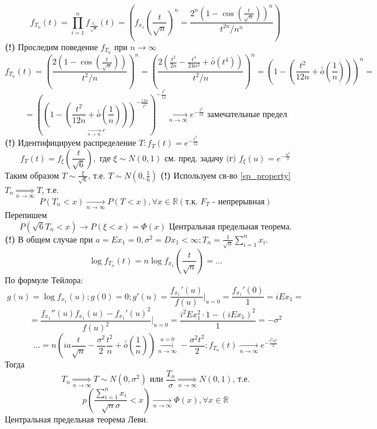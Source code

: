 \begin{exmp}
\begin{enumerate}
		\[ f_{T_n} (t) = \prod_{i=1}^{n} f_{\frac{x_i}{\sqrt{n}}} (t) = \left( f_{x_1} \left(\frac{t}{\sqrt{n}}\right)^n = \frac{2^n (1 - \cos \left( \frac{t}{\sqrt{n}} \right))^n}{t^{2n}/n^n} \right) \]
		\textbf{(!)} Проследим поведение $f_{T_n}$ при $n \to \infty$
		\[ f_{T_n} (t) = \left( \frac{2 (1 - \cos \left( \frac{t}{\sqrt{n}} \right))}{t^2 / n} \right)^n = \left( \frac{2 \left( \frac{t^2}{2n} - \frac{t^4}{24n^2} + \bar{\bar o} (t^4) \right)}{t^2 / n} \right)^n = \left( 1 - \left( \frac{t^2}{12n} + \bar{\bar o} \left( \frac{1}{n} \right) \right) \right)^n = \]
		\[ = \left( \underset{\underset{n \to \infty}{\to} e}{\left( 1 - \left( \frac{t^2}{12n} + \bar{\bar o} \left(\frac{1}{n}\right) \right) \right)^{-\frac{12n}{t^2}}} \right)^{- \frac{t^2}{12}} \underset{n \to \infty}{\to} e^{- \frac{t^2}{12}} \text{ замечательные предел} \]
		\textbf{(!)} Идентифицируем распределение $T: f_{T} (t) = e^{-\frac{t^2}{12}}$
		\[ f_{T} (t) = f_{\xi} \left( \frac{t}{\sqrt{6}} \right), \text{ где } \xi \sim N(0, 1) \text{ см. пред. задачу (г) } f_{\xi} (u) = e^{- \frac{u^2}{2}} \]
		Таким образом $T \sim \frac{\xi}{\sqrt{6}}$, т.е. $T \sim N \left( 0, \frac{1}{6} \right)$
		\textbf{(!)} Используем св-во \ref{sp_property} $T_n \underset{n \to \infty}{\Rightarrow} T$, т.е.
		\[ P(T_n < x) \underset{n \to \infty}{\to} P(T < x), \forall x \in \mathbb{R} (\text{т.к. } F_T \text{ - непрерывная}) \]
		Перепишем
		\[ P(\sqrt{6} T_n < x) \to P(\xi < x) = \Phi (x) \text{ Центральная предельная теорема.} \]
		\textbf{(!)} В общем случае при $a = Ex_1 = 0, \sigma^2 = Dx_1 < \infty; T_n = \frac{1}{\sqrt{n}} \sum\limits_{i=1}^{n} x_i$.
		\[ \log f_{T_n} (t) = n \log f_{x_1} \left( \frac{t}{\sqrt{n}} \right) = \dots \]
		По формуле Тейлора:
		\[
		g(u) = \log f_{x_1} (u); g(0) = 0; g'(u) = \frac{f_{x_1}'(u)}{f(u)} \bigg|_{u=0} = \frac{f_{x_1}' (0)}{1} = i Ex_1 =
		\]
		\[
		= \frac{f_{x_1}'' (u) f_{x_1} (u) - f_{x_1}' (u)^2}{f(u)^2} \bigg|_{u=0} = \frac{i^2 E x_1^2 \cdot 1 - (i Ex_1)^2}{1} = - \sigma^2
		\]
		\[ \dots = n \left( ia \frac{t}{\sqrt{n}} - \frac{\sigma^2}{2} \frac{t^2}{n} + \bar{\bar o} \left( \frac{1}{n} \right) \right) \overset{a=0}{\underset{n \to \infty}{\to}} - \frac{\sigma^2 t^2}{2}; f_{T_n} (t) \underset{n \to \infty}{\to} e^{- \frac{t^2 \sigma^2}{2}} \]
		Тогда
		\[ T_n \underset{n \to \infty}{\Rightarrow} T \sim N (0, \sigma^2) \text{ или } \frac{T_n}{\sigma} \underset{n \to \infty}{\Rightarrow} N(0, 1) \text{, т.е.} \]
		\[ p \left( \frac{\sum\limits_{i=1}^{n} x_i}{\sqrt{n} \sigma} < x \right) \underset{n \to \infty}{\to} \Phi (x), \forall x \in \mathbb{R} \]
		Центральная предельная теорема Леви.
	\end{enumerate}
\end{exmp}
